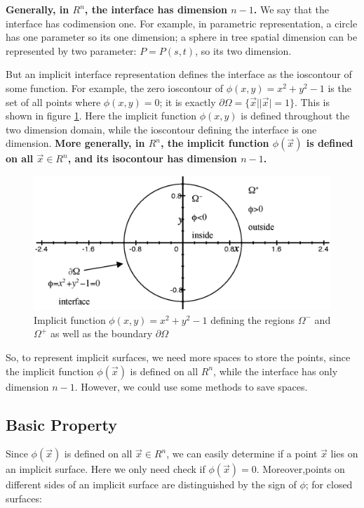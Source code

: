 \textbf{Generally, in $R^n$, the interface has dimension $n-1$.} We say that the interface has codimension one. For example, in parametric representation, a circle has one parameter so its one dimension; a sphere in tree spatial dimension can be represented by two parameter: $P=P(s,t)$, so its two dimension.

But an implicit interface representation defines the interface as the ioscontour of some function. For example, the zero ioscontour of $\phi(x,y)=x^2+y^2-1$ is the set of all points where $\phi(x,y)=0$; it is exactly $\partial\Omega=\{\vec{x}||\vec{x}|=1\}$. This is shown in figure \ref{f:implicit-function}. Here the implicit function $\phi(x,y)$ is defined throughout the two dimension domain, while the ioscontour defining the interface is one dimension. \textbf{More generally, in $R^n$, the implicit function $\phi(\vec{x})$ is defined on all $\vec{x}\in R^n$, and its isocontour has dimension $n-1$.}

\begin{figure}\label{f:implicit-function}
	\includegraphics{graphics/df/implicit-function}
	\caption{Implicit function $\phi(x,y)=x^2+y^2-1$ defining the regions $\Omega^-$ and $\Omega^+$ as well as the boundary $\partial\Omega$}
\end{figure}

So, to represent implicit surfaces, we need more spaces to store the points, since the implicit function $\phi(\vec{x})$ is defined on all $R^n$, while the interface has only dimension $n-1$. However, we could use some methods to save spaces. 




\subsection{Basic Property}
Since $\phi(\vec{x})$ is defined on all $\vec{x}\in R^n$, we can easily determine if a point $\vec{x}$ lies on an implicit surface. Here we only need check if $\phi(\vec{x})=0$. Moreover,points on different sides of an implicit surface are distinguished by the sign of $\phi$; for closed surfaces:

